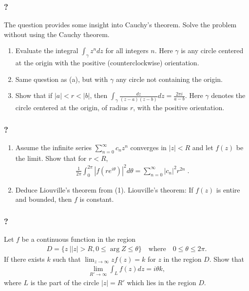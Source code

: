 \hypertarget{section-122}{%
\subsubsection{?}\label{section-122}}

The question provides some insight into Cauchy's theorem. Solve the
problem without using the Cauchy theorem.

\begin{enumerate}
\def\labelenumi{\arabic{enumi}.}
\item
  Evaluate the integral \(\displaystyle{\int_{\gamma} z^n dz}\) for all
  integers \(n\). Here \(\gamma\) is any circle centered at the origin
  with the positive (counterclockwise) orientation.
\item
  Same question as (a), but with \(\gamma\) any circle not containing
  the origin.
\item
  Show that if \(|a|<r<|b|\), then
  \(\displaystyle{\int_{\gamma}\frac{dz}{(z-a)(z-b)} dz=\frac{2\pi i}{a-b}}\).
  Here \(\gamma\) denotes the circle centered at the origin, of radius
  \(r\), with the positive orientation.
\end{enumerate}

\hypertarget{section-123}{%
\subsubsection{?}\label{section-123}}

\begin{enumerate}
\def\labelenumi{(\arabic{enumi})}
\item
  Assume the infinite series \(\displaystyle \sum_{n=0}^\infty c_n z^n\)
  converges in \(|z| < R\) and let \(f(z)\) be the limit. Show that for
  \(r <R\),
  \begin{align*}\frac{1}{2 \pi} \int_0^{2 \pi} |f(r e^{i \theta})|^2 d \theta =
  \sum_{n=0}^\infty |c_n|^2 r^{2n} \; .\end{align*}
\item
  Deduce Liouville's theorem from (1). Liouville's theorem: If \(f(z)\)
  is entire and bounded, then \(f\) is constant.
\end{enumerate}

\hypertarget{section-124}{%
\subsubsection{?}\label{section-124}}

Let \(f\) be a continuous function in the region
\begin{align*}D=\{z\ |  |z|>R, 0\leq \arg Z\leq \theta\}\quad\text{where}\quad
0\leq \theta \leq 2\pi.\end{align*}
If there exists \(k\) such that
\(\displaystyle{\lim_{z\to\infty} zf(z)=k}\) for \(z\) in the region
\(D\). Show that
\begin{align*}\lim_{R'\to\infty} \int_{L} f(z) dz=i\theta k,\end{align*}
where \(L\) is the part of the circle \(|z|=R'\) which lies in the
region \(D\).

